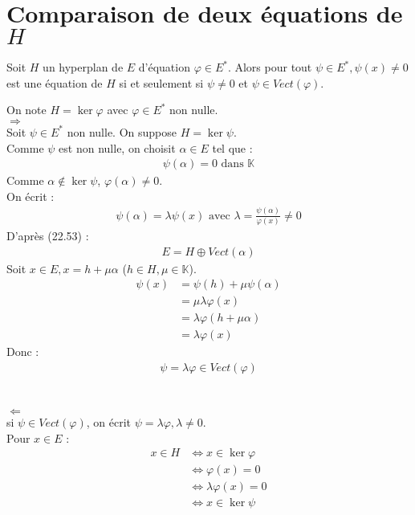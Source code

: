 \documentclass[../main.tex]{subfiles}
\begin{document}
\section{Comparaison de deux équations de $H$}
\begin{tcolorbox}[title=Propostion 22.54, title filled=false, colframe=lightblue, colback=lightblue!10!white]
    Soit $H$ un hyperplan de $E$ d'équation $\varphi \in E^*$. Alors pour tout $\psi \in E^*, \psi(x) \neq 0$ est une équation de $H$ si et seulement si $\psi \neq 0$ et $\psi \in Vect(\varphi)$.
\end{tcolorbox}

On note $H = \ker \varphi$ avec $\varphi \in E^*$ non nulle. \\
$\boxed{\Rightarrow}$ \\
Soit $\psi \in E^*$ non nulle. On suppose $H = \ker \psi$. \\
Comme $\psi$ est non nulle, on choisit $\alpha\in E$ tel que : 
\begin{align*}
    \psi(\alpha) = 0 \text{ dans } \mathbb{K}
\end{align*}
Comme $\alpha\not\in\ker \psi$, $\varphi(\alpha) \neq 0$. \\
On écrit : 
\begin{align*}
    \psi(\alpha) = \lambda\psi(x) \text{ avec } \lambda = \frac{\psi(\alpha)}{\varphi(x)} \neq 0
\end{align*}
D'après (22.53) : 
\begin{align*}
    E = H \oplus Vect(\alpha)
\end{align*}
Soit $x\in E, x = h + \mu \alpha$ ($h\in H, \mu \in \mathbb{K}$). 
\begin{align*}
    \psi(x) &= \psi(h) + \mu \psi(\alpha) \\
    &= \mu \lambda \varphi(x) \\
    &= \lambda \varphi(h + \mu \alpha) \\
    &= \lambda \varphi(x)
\end{align*}
Donc : 
\begin{align*}
    \psi = \lambda \varphi \in Vect(\varphi)
\end{align*} \\ \\

$\boxed{\Leftarrow}$ \\
si $\psi \in Vect(\varphi)$, on écrit $\psi = \lambda \varphi, \lambda \neq 0$. \\
Pour $x\in E$ : 
\begin{align*}
    x\in H &\Leftrightarrow x\in \ker \varphi \\
    &\Leftrightarrow \varphi(x) = 0 \\
    &\Leftrightarrow \lambda \varphi(x) = 0 \\
    &\Leftrightarrow x\in \ker \psi
\end{align*}
\end{document}
